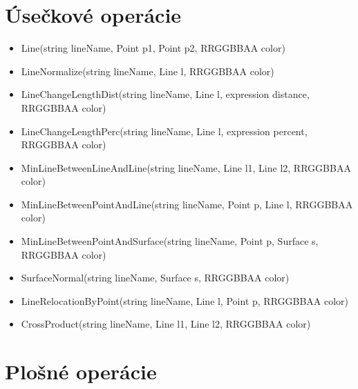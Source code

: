 \section{Úsečkové operácie}
		
\begin{itemize}
		\item Line(string lineName, Point p1, Point p2, RRGGBBAA color) 

		\item LineNormalize(string lineName, Line l, RRGGBBAA color)

		\item LineChangeLengthDist(string lineName, Line l, expression distance, RRGGBBAA color)
		
		\item LineChangeLengthPerc(string lineName, Line l, expression percent, RRGGBBAA color) 



		
		\item MinLineBetweenLineAndLine(string lineName, Line l1, Line l2, RRGGBBAA color)
		
		\item MinLineBetweenPointAndLine(string lineName, Point p, Line l, RRGGBBAA color)
		
		\item MinLineBetweenPointAndSurface(string lineName, Point p, Surface s, RRGGBBAA color)


		\item SurfaceNormal(string lineName, Surface s, RRGGBBAA color) 



		\item LineRelocationByPoint(string lineName, Line l, Point p, RRGGBBAA color)


		\item CrossProduct(string lineName, Line l1, Line l2, RRGGBBAA color)

\end{itemize}

\section{Plošné operácie}

